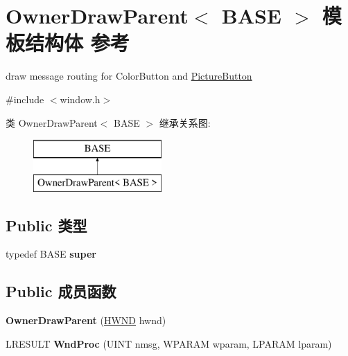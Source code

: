 \hypertarget{struct_owner_draw_parent}{}\section{Owner\+Draw\+Parent$<$ B\+A\+SE $>$ 模板结构体 参考}
\label{struct_owner_draw_parent}


draw message routing for Color\+Button and \hyperlink{struct_picture_button}{Picture\+Button}  




{\ttfamily \#include $<$window.\+h$>$}

类 Owner\+Draw\+Parent$<$ B\+A\+SE $>$ 继承关系图\+:\begin{figure}[H]
\begin{center}
\leavevmode
\includegraphics[height=2.000000cm]{struct_owner_draw_parent}
\end{center}
\end{figure}
\subsection*{Public 类型}
\begin{DoxyCompactItemize}
\item 
\mbox{\label{struct_owner_draw_parent_a2ec651b886d5a1d86881a8fae5fdb1d0}} 
typedef B\+A\+SE {\bfseries super}
\end{DoxyCompactItemize}
\subsection*{Public 成员函数}
\begin{DoxyCompactItemize}
\item 
\mbox{\label{struct_owner_draw_parent_a2f1dea97b36aec5cbc39f20e865db367}} 
{\bfseries Owner\+Draw\+Parent} (\hyperlink{interfacevoid}{H\+W\+ND} hwnd)
\item 
\mbox{\label{struct_owner_draw_parent_a75cc91a58525f7556e3464c2eef55cb4}} 
L\+R\+E\+S\+U\+LT {\bfseries Wnd\+Proc} (U\+I\+NT nmsg, W\+P\+A\+R\+AM wparam, L\+P\+A\+R\+AM lparam)
\end{DoxyCompactItemize}


